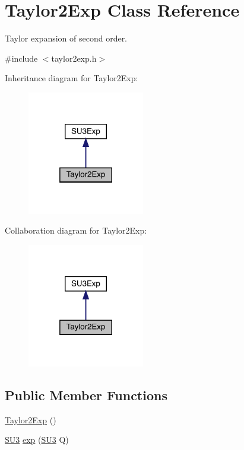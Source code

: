 \hypertarget{class_taylor2_exp}{}\section{Taylor2\+Exp Class Reference}
\label{class_taylor2_exp}


Taylor expansion of second order.  




{\ttfamily \#include $<$taylor2exp.\+h$>$}



Inheritance diagram for Taylor2\+Exp\+:\nopagebreak
\begin{figure}[H]
\begin{center}
\leavevmode
\includegraphics[width=145pt]{class_taylor2_exp__inherit__graph}
\end{center}
\end{figure}


Collaboration diagram for Taylor2\+Exp\+:\nopagebreak
\begin{figure}[H]
\begin{center}
\leavevmode
\includegraphics[width=145pt]{class_taylor2_exp__coll__graph}
\end{center}
\end{figure}
\subsection*{Public Member Functions}
\begin{DoxyCompactItemize}
\item 
\mbox{\hyperlink{class_taylor2_exp_ac3b48be4c567e163f7baaa041121a93f}{Taylor2\+Exp}} ()
\item 
\mbox{\hyperlink{class_s_u3}{S\+U3}} \mbox{\hyperlink{class_taylor2_exp_af1d32ac99447c063e364ebf37ba2752e}{exp}} (\mbox{\hyperlink{class_s_u3}{S\+U3}} Q)
\end{DoxyCompactItemize}


